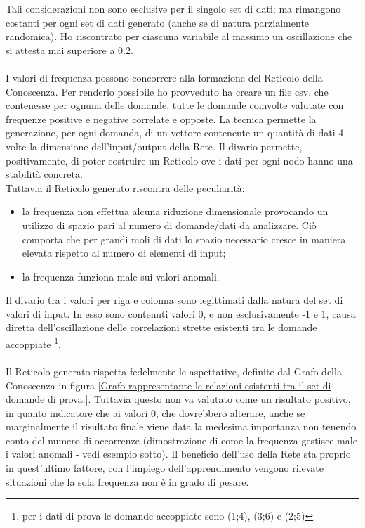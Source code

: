 \noindent
Tali considerazioni non sono esclusive per il singolo set di dati; ma rimangono costanti per ogni set di dati generato (anche se di natura parzialmente randomica). Ho riscontrato per ciascuna variabile al massimo un oscillazione che si attesta mai superiore a 0.2.
\\\\
I valori di frequenza possono concorrere alla formazione del Reticolo della Conoscenza. Per renderlo possibile ho provveduto ha creare un file csv, che contenesse per ognuna delle domande, tutte le domande coinvolte valutate con frequenze positive e negative correlate e opposte. La tecnica permette la generazione, per ogni domanda, di un vettore contenente un quantit\`a di dati 4 volte la dimensione dell'input/output della Rete.
Il divario permette, positivamente, di poter costruire un Reticolo ove i dati per ogni nodo hanno una stabilit\`a concreta.\\
Tuttavia il Reticolo generato riscontra delle peculiarit\`a:
\begin{itemize}
\item la frequenza non effettua alcuna riduzione dimensionale provocando un utilizzo di spazio pari al numero di domande/dati da analizzare. Ci\`o comporta che per grandi moli di dati lo spazio necessario cresce in maniera elevata rispetto al numero di elementi di input;
\item la frequenza funziona male sui valori anomali.
\end{itemize}
\noindent
Il divario tra i valori per riga e colonna sono legittimati dalla natura del set di valori di input. In esso sono contenuti valori 0, e non esclusivamente -1 e 1, causa diretta dell'oscillazione delle correlazioni strette esistenti tra le domande accoppiate \footnote{per i dati di prova le domande accoppiate sono (1;4), (3;6) e (2;5)}.\\\\
\noindent
Il Reticolo generato rispetta fedelmente le aspettative, definite dal Grafo della Conoscenza in figura \ref{Grafo rappresentante le relazioni esistenti tra il set di domande di prova.}. Tuttavia questo non va valutato come un risultato positivo, in quanto indicatore che ai valori 0, che dovrebbero alterare, anche se marginalmente il risultato finale viene data la medesima importanza non tenendo conto del numero di occorrenze (dimostrazione di come la frequenza gestisce male i valori anomali - vedi esempio sotto). Il beneficio dell'uso della Rete sta proprio in quest'ultimo fattore, con l'impiego dell'apprendimento vengono rilevate situazioni che la sola frequenza non \`e in grado di pesare.


